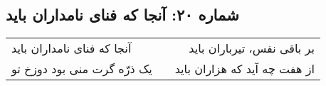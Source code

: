 \begin{center}
\section*{شماره ۲۰: آنجا که فنای نامداران باید}
\label{sec:020}
\begin{longtable}{l p{0.5cm} r}
آنجا که فنای نامداران باید
&&
بر باقی نفس، تیرباران باید
\\
یک ذرّه گرت منی بود دوزخ تو
&&
از هفت چه آید که هزاران باید
\\
\end{longtable}
\end{center}

